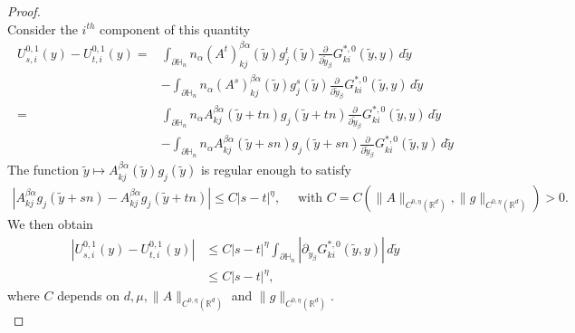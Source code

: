 \documentclass[10pt,a4paper]{amsart}
\begin{document}
\begin{proof}[Proof]
		
		\\
		Consider the  $i^{th}$ component of this quantity
		\begin{align*}
			U^{0,1}_{s,i}(y)- 	U^{0,1}_{t,i}(y) 
			=&
			\int_{\partial\mathbb{H}_n} 
			n_\alpha (A^t)^{\beta\alpha}_{kj}(\tilde{y})g^t_j(\tilde{y})\frac{\partial}{\partial \tilde{y}_\beta} G^{*,0}_{ki} \left(\tilde{y},y \right)\,d\tilde{y} \\
			&	- \int_{\partial\mathbb{H}_n} 
			n_\alpha (A^s)^{\beta\alpha}_{kj}(\tilde{y})g^s_j(\tilde{y})\frac{\partial}{\partial \tilde{y}_\beta} G^{*,0}_{ki} \left(\tilde{y},y \right)\,d\tilde{y} \\
			=& \int_{\partial\mathbb{H}_n} 
			n_\alpha A^{\beta\alpha}_{kj}(\tilde{y}+tn)g_j(\tilde{y}+tn)\frac{\partial}{\partial \tilde{y}_\beta} G^{*,0}_{ki} \left(\tilde{y},y \right)\,d\tilde{y} \\
			&	- \int_{\partial\mathbb{H}_n} 
			n_\alpha A^{\beta\alpha}_{kj}(\tilde{y}+sn)g_j(\tilde{y}+sn)\frac{\partial}{\partial \tilde{y}_\beta} G^{*,0}_{ki} \left(\tilde{y},y \right)
			\,d\tilde{y} 
		\end{align*}
		The function $\tilde{y}\mapsto A^{\beta\alpha}_{kj}(\tilde{y})g_j(\tilde{y})$ is regular enough to satisfy \begin{align*}
			|A^{\beta\alpha}_{kj}g_j(\tilde{y}+sn)- A^{\beta\alpha}_{kj}g_j(\tilde{y}+tn)|\leq C |s-t|^\eta, \quad \mbox{ with } C=C(\|A\|_{C^{0,\eta}(\mathbb{R}^d)}, \|g\|_{C^{0,\eta}(\mathbb{R}^d)})>0.
		\end{align*}We then obtain
		\begin{align*}
			|	U^{0,1}_{s,i}(y)- 	U^{0,1}_{t,i}(y) |
			&\leq  C |s-t|^\eta\int_{\partial\mathbb{H}_n} 
			|	\partial_{\tilde{y}_\beta} G^{*,0}_{ki} \left(\tilde{y},y \right)|\,d\tilde{y}\\ &\leq C |s-t|^\eta,
		\end{align*}
	where $C$ depends on $d, \mu, \|A\|_{C^{0,\eta}(\mathbb{R}^d)}$ and $\|g\|_{C^{0,\eta}(\mathbb{R}^d)}.$\\
	

\end{proof}
\end{document}
